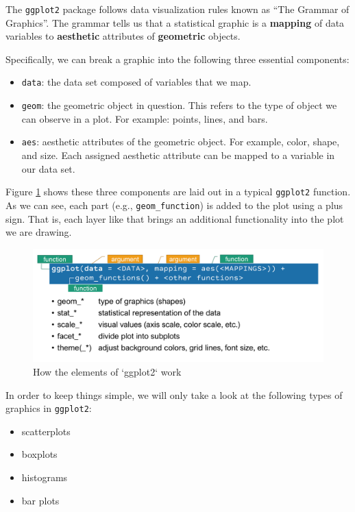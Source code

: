 \documentclass[]{book}
\providecommand{\tightlist}{%
  \setlength{\itemsep}{0pt}\setlength{\parskip}{0pt}}
\begin{document}
The \texttt{ggplot2} package \citep{R-ggplot2} follows data visualization rules known as ``The Grammar of Graphics''. The grammar tells us that a statistical graphic is a \textbf{mapping} of data variables to \textbf{aesthetic} attributes of \textbf{geometric} objects.

Specifically, we can break a graphic into the following three essential components:

\begin{itemize}
\tightlist
\item
  \texttt{data}: the data set composed of variables that we map.
\item
  \texttt{geom}: the geometric object in question. This refers to the type of object we can observe in a plot. For example: points, lines, and bars.
\item
  \texttt{aes}: aesthetic attributes of the geometric object. For example, color, shape, and size. Each assigned aesthetic attribute can be mapped to a variable in our data set.
\end{itemize}

Figure \ref{fig:ggplotmap} shows these three components are laid out in a typical \texttt{ggplot2} function. As we can see, each part (e.g., \texttt{geom\_function}) is added to the plot using a plus sign. That is, each layer like that brings an additional functionality into the plot we are drawing.

\begin{figure}

{\centering \includegraphics[width=0.65\linewidth]{figure/ggplot} 

}

\caption{How the elements of `ggplot2` work}\label{fig:ggplotmap}
\end{figure}

In order to keep things simple, we will only take a look at the following types of graphics in \texttt{ggplot2}:

\begin{itemize}
\tightlist
\item
  scatterplots
\item
  boxplots
\item
  histograms
\item
  bar plots
\end{itemize}
\end{document}
